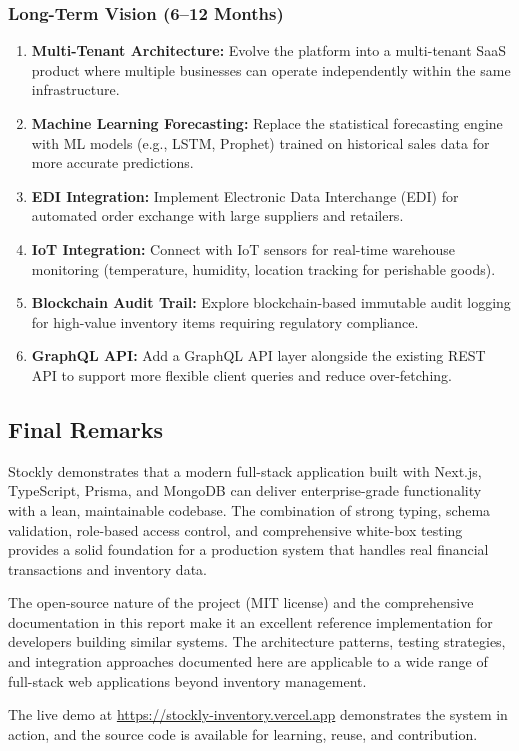 \documentclass[12pt,onecolumn]{IEEEtran}
\begin{document}
\subsubsection{Long-Term Vision (6--12 Months)}

\begin{enumerate}[leftmargin=1.5em]
  \item \textbf{Multi-Tenant Architecture:} Evolve the platform into a multi-tenant SaaS product where multiple businesses can operate independently within the same infrastructure.
  \item \textbf{Machine Learning Forecasting:} Replace the statistical forecasting engine with ML models (e.g., LSTM, Prophet) trained on historical sales data for more accurate predictions.
  \item \textbf{EDI Integration:} Implement Electronic Data Interchange (EDI) for automated order exchange with large suppliers and retailers.
  \item \textbf{IoT Integration:} Connect with IoT sensors for real-time warehouse monitoring (temperature, humidity, location tracking for perishable goods).
  \item \textbf{Blockchain Audit Trail:} Explore blockchain-based immutable audit logging for high-value inventory items requiring regulatory compliance.
  \item \textbf{GraphQL API:} Add a GraphQL API layer alongside the existing REST API to support more flexible client queries and reduce over-fetching.
\end{enumerate}

\subsection{Final Remarks}

Stockly demonstrates that a modern full-stack application built with Next.js, TypeScript, Prisma, and MongoDB can deliver enterprise-grade functionality with a lean, maintainable codebase. The combination of strong typing, schema validation, role-based access control, and comprehensive white-box testing provides a solid foundation for a production system that handles real financial transactions and inventory data.

The open-source nature of the project (MIT license) and the comprehensive documentation in this report make it an excellent reference implementation for developers building similar systems. The architecture patterns, testing strategies, and integration approaches documented here are applicable to a wide range of full-stack web applications beyond inventory management.

The live demo at \url{https://stockly-inventory.vercel.app} demonstrates the system in action, and the source code is available for learning, reuse, and contribution.





\appendix
\end{document}
